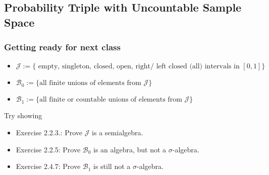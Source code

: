 \documentclass[handout]{beamer}
\begin{document}
\subsection{Probability Triple with Uncountable Sample Space}
\frame
{
  \frametitle{Getting ready for next class}


   \begin{itemize}
   \item<1-> $\mathcal{J} := \{\text{ empty, singleton, closed, open, right/ left closed (all) intervals in } [0,1] \}$    
   \item<2-> $\mathcal{B}_0 := \{ \text{all finite unions of elements from } \mathcal{J} \}$
   \item<3-> $\mathcal{B}_1 := \{ \text{all finite or countable unions of elements from } \mathcal{J} \}$
   \end{itemize}
   
   Try showing
   \begin{itemize}
   \item Exercise 2.2.3.: Prove $\mathcal{J}$ is a semialgebra.
   \item Exercise 2.2.5: Prove $\mathcal{B}_0$ is an algebra, but not a $\sigma$-algebra.
   \item Exercise 2.4.7: Prove $\mathcal{B}_1$ is still not a $\sigma$-algebra.
   \end{itemize}
}
\end{document}
